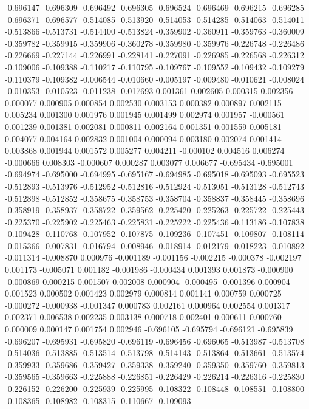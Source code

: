 -0.696147
-0.696309
-0.696492
-0.696305
-0.696524
-0.696469
-0.696215
-0.696285
-0.696371
-0.696577
-0.514085
-0.513920
-0.514053
-0.514285
-0.514063
-0.514011
-0.513866
-0.513731
-0.514400
-0.513824
-0.359902
-0.360911
-0.359763
-0.360009
-0.359782
-0.359915
-0.359906
-0.360278
-0.359980
-0.359976
-0.226748
-0.226486
-0.226669
-0.227144
-0.226991
-0.228141
-0.227091
-0.226985
-0.226568
-0.226312
-0.109006
-0.109388
-0.110217
-0.110795
-0.109767
-0.109552
-0.109432
-0.109279
-0.110379
-0.109382
-0.006544
-0.010660
-0.005197
-0.009480
-0.010621
-0.008024
-0.010353
-0.010523
-0.011238
-0.017693
0.001361
0.002605
0.000315
0.002356
0.000077
0.000905
0.000854
0.002530
0.003153
0.000382
0.000897
0.002115
0.005234
0.001300
0.001976
0.001945
0.001499
0.002974
0.001957
-0.000561
0.001239
0.001381
0.002081
0.000811
0.002164
0.001351
0.001559
0.005181
0.004077
0.004164
0.002832
0.001004
0.000094
0.003180
0.002074
0.001414
0.003868
0.001944
0.001572
0.005277
0.004211
-0.000102
0.004516
0.006274
-0.000666
0.008303
-0.000607
0.000287
0.003077
0.006677
-0.695434
-0.695001
-0.694974
-0.695000
-0.694995
-0.695167
-0.694985
-0.695018
-0.695093
-0.695523
-0.512893
-0.513976
-0.512952
-0.512816
-0.512924
-0.513051
-0.513128
-0.512743
-0.512898
-0.512852
-0.358675
-0.358753
-0.358704
-0.358837
-0.358445
-0.358696
-0.358919
-0.358937
-0.358722
-0.359562
-0.225420
-0.225263
-0.225722
-0.225443
-0.225370
-0.225902
-0.225463
-0.225831
-0.225222
-0.225436
-0.113186
-0.107838
-0.109428
-0.110768
-0.107952
-0.107875
-0.109236
-0.107451
-0.109807
-0.108114
-0.015366
-0.007831
-0.016794
-0.008946
-0.018914
-0.012179
-0.018223
-0.010892
-0.011314
-0.008870
0.000976
-0.001189
-0.001156
-0.002215
-0.000378
-0.002197
0.001173
-0.005071
0.001182
-0.001986
-0.000434
0.001393
0.001873
-0.000900
-0.000869
0.000215
0.001507
0.002008
0.000904
-0.000495
-0.001396
0.000904
0.001523
0.000502
0.001423
0.002979
0.000814
0.001141
0.000759
0.000725
-0.000272
-0.000938
-0.001347
0.000783
0.002161
0.000964
0.002554
0.001317
0.002371
0.006538
0.002235
0.003138
0.000718
0.002401
0.000611
0.000760
0.000009
0.000147
0.001754
0.002946
-0.696105
-0.695794
-0.696121
-0.695839
-0.696207
-0.695931
-0.695820
-0.696119
-0.696456
-0.696065
-0.513987
-0.513708
-0.514036
-0.513885
-0.513514
-0.513798
-0.514143
-0.513864
-0.513661
-0.513574
-0.359933
-0.359686
-0.359427
-0.359338
-0.359240
-0.359350
-0.359760
-0.359813
-0.359565
-0.359663
-0.225888
-0.226851
-0.226429
-0.226214
-0.226316
-0.225830
-0.226152
-0.226200
-0.225939
-0.225995
-0.108322
-0.108448
-0.108551
-0.108800
-0.108365
-0.108982
-0.108315
-0.110667
-0.109093
